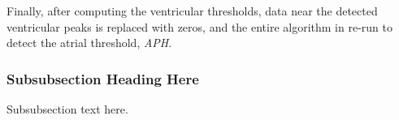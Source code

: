 \documentclass[conference]{IEEEtran}
\newcommand{\APH}{\textit{APH}}
\begin{document}
Finally, after computing the ventricular thresholds,
data near the detected ventricular peaks is replaced with
zeros, and the entire algorithm in re-run to detect the
atrial threshold, \APH{}.

\subsubsection{Subsubsection Heading Here}
Subsubsection text here.


%
%



%
%
\end{document}
